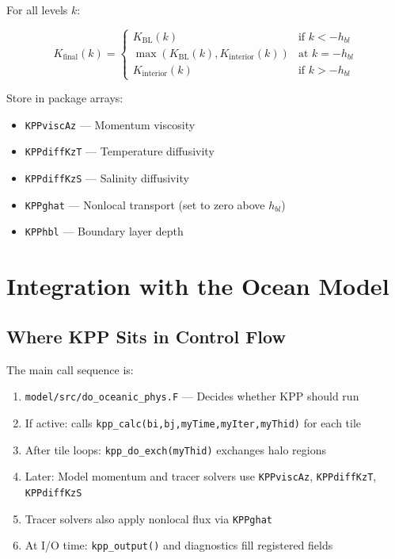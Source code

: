 \documentclass[11pt, a4paper]{article}
\begin{document}
For all levels $k$:

\begin{equation}
K_{\text{final}}(k) = \begin{cases}
K_{\text{BL}}(k) & \text{if } k < -h_{bl} \\
\max(K_{\text{BL}}(k), K_{\text{interior}}(k)) & \text{at } k = -h_{bl} \\
K_{\text{interior}}(k) & \text{if } k > -h_{bl}
\end{cases}
\end{equation}

Store in package arrays:
\begin{itemize}
    \item \texttt{KPPviscAz} — Momentum viscosity
    \item \texttt{KPPdiffKzT} — Temperature diffusivity
    \item \texttt{KPPdiffKzS} — Salinity diffusivity
    \item \texttt{KPPghat} — Nonlocal transport (set to zero above $h_{bl}$)
    \item \texttt{KPPhbl} — Boundary layer depth
\end{itemize}

\section{Integration with the Ocean Model}

\subsection{Where KPP Sits in Control Flow}

The main call sequence is:

\begin{enumerate}
    \item \texttt{model/src/do\_oceanic\_phys.F} — Decides whether KPP should run
    \item If active: calls \texttt{kpp\_calc(bi,bj,myTime,myIter,myThid)} for each tile
    \item After tile loops: \texttt{kpp\_do\_exch(myThid)} exchanges halo regions
    \item Later: Model momentum and tracer solvers use \texttt{KPPviscAz}, \texttt{KPPdiffKzT}, \texttt{KPPdiffKzS}
    \item Tracer solvers also apply nonlocal flux via \texttt{KPPghat}
    \item At I/O time: \texttt{kpp\_output()} and diagnostics fill registered fields
\end{enumerate}
\end{document}
